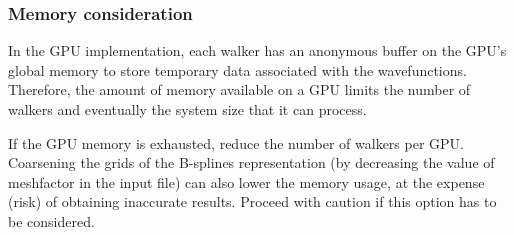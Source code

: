 
\subsubsection{Memory consideration}

In the GPU implementation, each walker has an anonymous buffer on the GPU's global memory to store temporary data associated with the wavefunctions. Therefore, the amount of memory available on a GPU limits the number of walkers and eventually the system size that it can process.

If the GPU memory is exhausted, reduce the number of walkers per GPU. Coarsening the grids of the B-splines representation (by decreasing the value of meshfactor in the input file) can also lower the memory usage, at the expense (risk) of obtaining inaccurate results. Proceed with caution if this option has to be considered.

